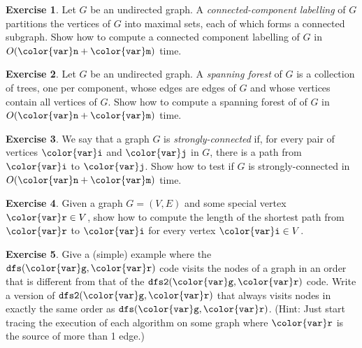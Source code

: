 \documentclass[10pt]{book}
\theoremstyle{plain}
\theoremstyle{definition}
\newtheorem{exc}{Exercise}[chapter]
\begin{document}
\begin{exc}
  Let $G$ be an undirected graph.  A \emph{connected-component labelling}
  of $G$ partitions the vertices of $G$ into maximal sets, each of which
  forms a connected subgraph.  Show how to compute a connected component
  labelling of $G$ in $O(\ensuremath{\mathtt{{\color{var}n}}}+\ensuremath{\mathtt{{\color{var}m}}})$ time.
\end{exc}

\begin{exc}
  Let $G$ be an undirected graph.  A \emph{spanning forest} of $G$ is a
  collection of trees, one per component, whose edges are edges of $G$
  and whose vertices contain all vertices of $G$.  Show how to compute
  a spanning forest of of $G$ in $O(\ensuremath{\mathtt{{\color{var}n}}}+\ensuremath{\mathtt{{\color{var}m}}})$ time.
\end{exc}

\begin{exc}
  We say that a graph $G$ is \emph{strongly-connected} if, for every
  pair of vertices \ensuremath{\mathtt{{\color{var}i}}} and \ensuremath{\mathtt{{\color{var}j}}} in $G$, there is a path from $\ensuremath{\mathtt{{\color{var}i}}}$ to
  $\ensuremath{\mathtt{{\color{var}j}}}$. Show how to test if $G$ is strongly-connected in $O(\ensuremath{\mathtt{{\color{var}n}}}+\ensuremath{\mathtt{{\color{var}m}}})$
  time.
\end{exc}

\begin{exc}
  Given a graph $G=(V,E)$ and some special vertex $\ensuremath{\mathtt{{\color{var}r}}}\in V$, show how
  to compute the length of the shortest path from $\ensuremath{\mathtt{{\color{var}r}}}$ to \ensuremath{\mathtt{{\color{var}i}}} for every
  vertex $\ensuremath{\mathtt{{\color{var}i}}}\in V$.
\end{exc}

\begin{exc}
  Give a (simple) example where the \ensuremath{\mathtt{dfs({\color{var}g},{\color{var}r})}} code visits the nodes of a
  graph in an order that is different from that of the \ensuremath{\mathtt{dfs2({\color{var}g},{\color{var}r})}} code.
  Write a version of \ensuremath{\mathtt{dfs2({\color{var}g},{\color{var}r})}} that always visits nodes in exactly
  the same order as \ensuremath{\mathtt{dfs({\color{var}g},{\color{var}r})}}.  (Hint: Just start tracing the execution
  of each algorithm on some graph where \ensuremath{\mathtt{{\color{var}r}}} is the source of more than
  1 edge.)
\end{exc}
\end{document}
